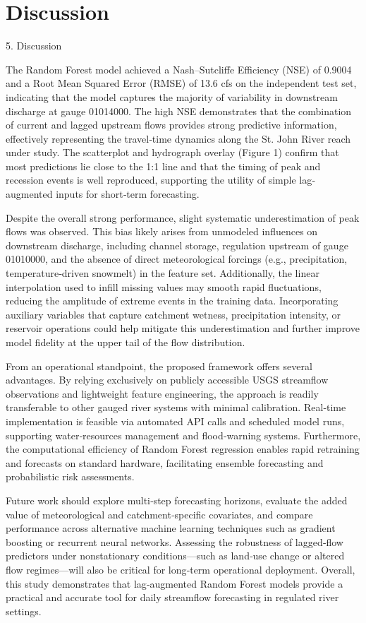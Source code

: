 \documentclass[preprint,12pt]{elsarticle}
\begin{document}
\section{Discussion}

5. Discussion

The Random Forest model achieved a Nash–Sutcliffe Efficiency (NSE) of 0.9004 and a Root Mean Squared Error (RMSE) of 13.6 cfs on the independent test set, indicating that the model captures the majority of variability in downstream discharge at gauge 01014000. The high NSE demonstrates that the combination of current and lagged upstream flows provides strong predictive information, effectively representing the travel‐time dynamics along the St. John River reach under study. The scatterplot and hydrograph overlay (Figure 1) confirm that most predictions lie close to the 1:1 line and that the timing of peak and recession events is well reproduced, supporting the utility of simple lag‐augmented inputs for short‐term forecasting.

Despite the overall strong performance, slight systematic underestimation of peak flows was observed. This bias likely arises from unmodeled influences on downstream discharge, including channel storage, regulation upstream of gauge 01010000, and the absence of direct meteorological forcings (e.g., precipitation, temperature‐driven snowmelt) in the feature set. Additionally, the linear interpolation used to infill missing values may smooth rapid fluctuations, reducing the amplitude of extreme events in the training data. Incorporating auxiliary variables that capture catchment wetness, precipitation intensity, or reservoir operations could help mitigate this underestimation and further improve model fidelity at the upper tail of the flow distribution.

From an operational standpoint, the proposed framework offers several advantages. By relying exclusively on publicly accessible USGS streamflow observations and lightweight feature engineering, the approach is readily transferable to other gauged river systems with minimal calibration. Real‐time implementation is feasible via automated API calls and scheduled model runs, supporting water‐resources management and flood‐warning systems. Furthermore, the computational efficiency of Random Forest regression enables rapid retraining and forecasts on standard hardware, facilitating ensemble forecasting and probabilistic risk assessments. 

Future work should explore multi‐step forecasting horizons, evaluate the added value of meteorological and catchment‐specific covariates, and compare performance across alternative machine learning techniques such as gradient boosting or recurrent neural networks. Assessing the robustness of lagged‐flow predictors under nonstationary conditions—such as land‐use change or altered flow regimes—will also be critical for long‐term operational deployment. Overall, this study demonstrates that lag‐augmented Random Forest models provide a practical and accurate tool for daily streamflow forecasting in regulated river settings.
\end{document}

